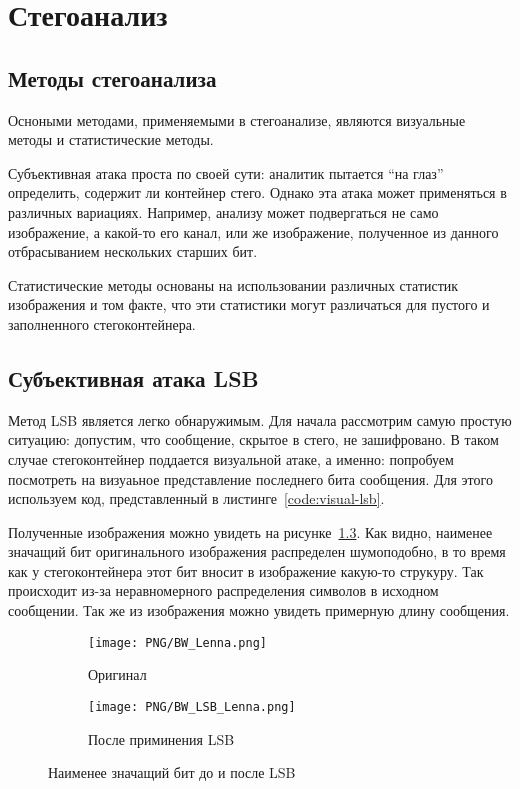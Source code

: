 \chapter{Стегоанализ}
\section{Методы стегоанализа}
Осноными методами, применяемыми в стегоанализе, являются визуальные методы и статистические методы.

Субъективная атака проста по своей сути: аналитик пытается ``на глаз'' определить, содержит ли контейнер стего.
Однако эта атака может применяться в различных вариациях. Например, анализу может подвергаться не само изображение,
а какой-то его канал, или же изображение, полученное из данного отбрасыванием нескольких старших бит.

Статистические методы основаны на использовании различных статистик изображения и том факте,
что эти статистики могут различаться для пустого и заполненного стегоконтейнера.

\section{Субъективная атака LSB}
Метод LSB является легко обнаружимым.
Для начала рассмотрим самую простую ситуацию: допустим,
что сообщение, скрытое в стего, не зашифровано.
В таком случае стегоконтейнер поддается визуальной атаке,
а именно: попробуем посмотреть на визуаьное представление
последнего бита сообщения. Для этого используем код,
представленный в листинге~\ref{code:visual-lsb}.

Полученные изображения можно увидеть на рисунке~\ref{img:bw-lsb}.
Как видно, наименее значащий бит оригинального изображения распределен
шумоподобно, в то время как у стегоконтейнера этот бит
вносит в изображение какую-то струкуру. Так происходит из-за
неравномерного распределения символов в исходном сообщении.
Так же из изображения можно увидеть примерную длину сообщения.
\begin{figure}[ht!]
    \centering
    \begin{subfigure}{.5\textwidth}
      \centering
      \texttt{[image: PNG/BW\_Lenna.png]}
      \caption{Оригинал}
      \label{img:bw-lenna-png}
    \end{subfigure}%
    \begin{subfigure}{.5\textwidth}
      \centering
      \texttt{[image: PNG/BW\_LSB\_Lenna.png]}
      \caption{После приминения LSB}
      \label{img:bw-lenna-lsb}
    \end{subfigure}
    \caption{Наименее значащий бит до и после LSB}
    \label{img:bw-lsb}
\end{figure}

